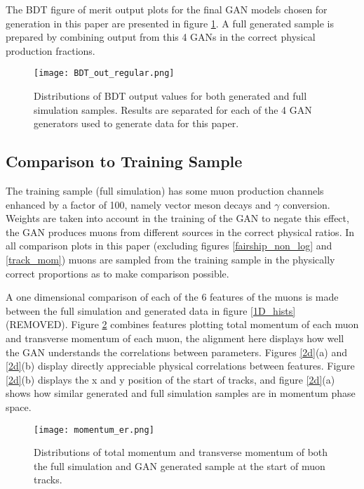 \documentclass{article}
\begin{document}
    The BDT figure of merit output plots for the final GAN models chosen for generation in this paper are presented in figure \ref{BDT_plot}. A full generated sample is prepared by combining output from this 4 GANs in the correct physical production fractions.


        \begin{figure}[h!]
        \centering
        \texttt{[image: BDT\_out\_regular.png]}
        \caption{Distributions of BDT output values for both generated and full simulation samples. Results are separated for each of the 4 GAN generators used to generate data for this paper. 
        }
        \label{BDT_plot}
        \end{figure}

        \subsection{Comparison to Training Sample}\label{compare}
        
            The training sample (full simulation) has some muon production channels enhanced by a factor of 100, namely vector meson decays and $\gamma$ conversion. Weights are taken into account in the training of the GAN to negate this effect, the GAN produces muons from different sources in the correct physical ratios. In all comparison plots in this paper (excluding figures \ref{fairship_non_log} and \ref{track_mom}) muons are sampled from the training sample in the physically correct proportions as to make comparison possible. 
            
            
            A one dimensional comparison of each of the 6 features of the muons is made between the full simulation and generated data in figure \ref{1D_hists} (REMOVED). Figure \ref{mom_plot} combines features plotting total momentum of each muon and transverse momentum of each muon, the alignment here displays how well the GAN understands the correlations between parameters. Figures \ref{2d}(a) and \ref{2d}(b) display directly appreciable physical correlations between features. Figure \ref{2d}(b) displays the x and y position of the start of tracks, and figure \ref{2d}(a) shows how similar generated and full simulation samples are in momentum phase space. 
        
        
            \begin{figure}[h!]
            \centering
            \texttt{[image: momentum\_er.png]}
            \caption{Distributions of total momentum and transverse momentum of both the full simulation and GAN generated sample at the start of muon tracks.}
            \label{mom_plot}
            \end{figure}
    
\end{document}
